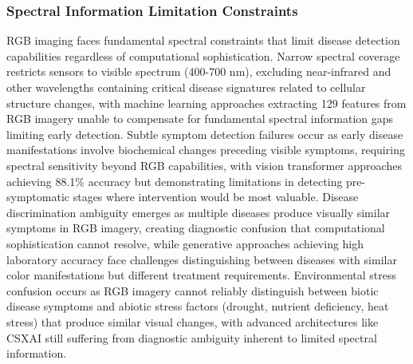 \documentclass[sn-mathphys]{sn-jnl}
\theoremstyle{thmstyleone}%
\theoremstyle{thmstyletwo}%
\theoremstyle{thmstylethree}%
\begin{document}
\subsubsection{Spectral Information Limitation Constraints}
RGB imaging faces fundamental spectral constraints that limit disease detection capabilities regardless of computational sophistication. Narrow spectral coverage restricts sensors to visible spectrum (400-700 nm), excluding near-infrared and other wavelengths containing critical disease signatures related to cellular structure changes, with machine learning approaches \citep{qin2016identification} extracting 129 features from RGB imagery unable to compensate for fundamental spectral information gaps limiting early detection. Subtle symptom detection failures occur as early disease manifestations involve biochemical changes preceding visible symptoms, requiring spectral sensitivity beyond RGB capabilities, with vision transformer approaches \citep{wu2021multi} achieving 88.1\% accuracy but demonstrating limitations in detecting pre-symptomatic stages where intervention would be most valuable. Disease discrimination ambiguity emerges as multiple diseases produce visually similar symptoms in RGB imagery, creating diagnostic confusion that computational sophistication cannot resolve, while generative approaches \citep{zhang2022mmdgan} achieving high laboratory accuracy face challenges distinguishing between diseases with similar color manifestations but different treatment requirements. Environmental stress confusion occurs as RGB imagery cannot reliably distinguish between biotic disease symptoms and abiotic stress factors (drought, nutrient deficiency, heat stress) that produce similar visual changes, with advanced architectures like CSXAI \citep{prince2024csxai} still suffering from diagnostic ambiguity inherent to limited spectral information.
\end{document}
